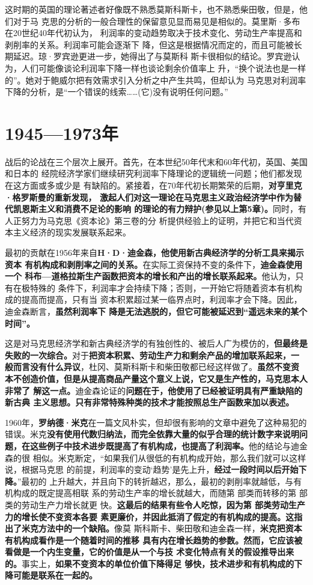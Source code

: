 这时期的英国的理论著述者好像既不熟悉莫斯科斯卡，也不熟悉柴田敬，但是，他们对于马
克思的分析的一般合理性的保留意见显而易见是相似的。莫里斯·多布在20世纪40年代初认为，
利润率的变动趋势取决于技术变化、劳动生产率提高和剥削率的关系。利润率可能会逐渐下
降，但这是根据情况而定的，而且可能被长期延迟。琼·罗宾逊更进一步，她得出了与莫斯科
斯卡很相似的结论。罗宾逊认为，人们可能像谈论利润率下降一样也谈论剩余价值率上
升，“换个说法也是一样的”。她对于鲍威尔把有效需求引入分析之中产生共鸣，但却认为
马克思对利润率下降的分析，是“一个错误的线索……(它)没有说明任何问题。”

\section{1945—1973年}
战后的论战在三个层次上展开。首先，在本世纪50年代末和60年代初，英国、美国和日本的
经院经济学家们继续研究利润率下降理论的逻辑统一问题；他们都发现在这方面或多或少是
有缺陷的。紧接着，在70年代初长期繁荣的后期，\textbf{对亨里克·格罗斯曼的重新发现，
  激起人们对这一理论在马克思主义政治经济学中作为替代凯恩斯主义和消费不足论的影响
  的理论的有力辩护(参见以上第5章)。}同时，有人正努力为马克思《资本论》第三卷的分
析提供经验上的证明，并把它和当代资本主义经济的现实发展联系起来。

最初的贡献在1956年来自\textbf{H·D·迪金森，他使用新古典经济学的分析工具来揭示资本
  有机构成和剥削率之间的关系。}在实际工资保持不变的条件下，\textbf{迪金森使用一个
  科布—道格拉斯生产函数把资本的增长和产出的增长联系起来。}他认为，只有在极特殊的
条件下，利润率才会持续下降；否则，一开始它将随着资本有机构成的提高而提高，只有当
资本积累超过某一临界点时，利润率才会下降。因此，迪金森断言，\textbf{虽然利润率下
  降是无法逃脱的，但它可能被延迟到“遥远未来的某个时间”。}

这是对马克思经济学和新古典经济学的有独创性的、被后人广为模仿的，\textbf{但最终是
  失败的一次综合。}对于\textbf{把资本积累、劳动生产力和剩余产品的增加联系起来，一
  般而言没有什么异议}，杜冈、莫斯科斯卡和柴田敬都已经这样做了。\textbf{虽然不变资
  本不创造价值，但是从提高商品产量这个意义上说，它又是生产性的，马克思本人非常了
  解这一点。}迪金森论证的\textbf{问题在于，他使用了已经被证明具有严重缺陷的新古典
  主义思想。只有非常特殊种类的技术才能按照总生产函数来加以表述。}

1960年，\textbf{罗纳德·米克}在一篇文风朴实，但却很有影响的文章中避免了这种易犯的
错误。米克\textbf{没有使用代数归纳法，而完全依靠大量的似乎合理的统计数字来说明问
  题，在这些例子中技术进步既提高了有机构成，也提高了利润率。}他的结论与迪金森的很
相似。米克断定，“如果我们从很低的有机构成开始，那么我们就可以这样说，根据马克思
的前提，利润率的变动‘趋势’是先上升，\textbf{经过一段时间以后开始下降。}”最初的
上升越大，并且向下的转折越迟，那么，最初的剥削率就越低，与有机构成的既定提高相联
系的劳动生产率的增长就越大，而随第 部类而转移的第 部类的劳动生产力增长就更
快。\textbf{这最后的结果有些令人吃惊，因为第 部类劳动生产力的增长使不变资本各要
  素更廉价，并因此抵消了假定的有机构成的提高。这指出了米克方法中的一个缺陷。}像莫
斯科斯卡、柴田敬和迪金森一样，\textbf{米克把资本有机构成看作是一个随着时间的推移
  具有内在增长趋势的参数。然而，它应该被看做是一个内生变量，它的价值是从一个与技
  术变化特点有关的假设推导出来的。}事实上，\textbf{如果不变资本的单位价值下降得足
  够快，技术进步和有机构成的下降可能是联系在一起的。}

